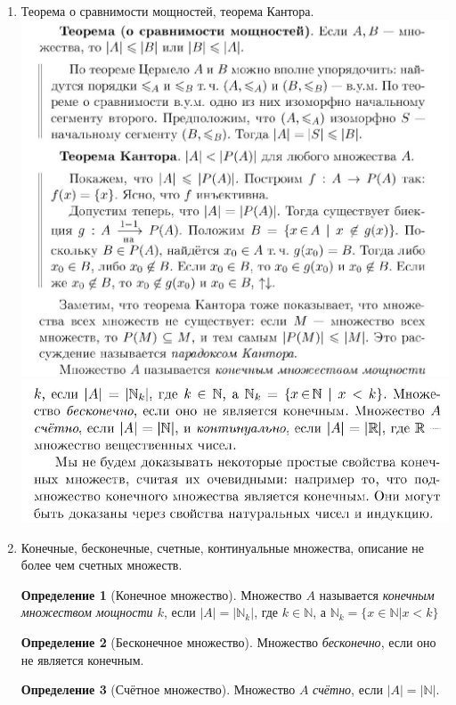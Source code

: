 \documentclass[a4paper]{article}
\theoremstyle{definition}
\newtheorem*{definition*}{Определение}
\begin{document}
\begin{enumerate}
 \item Теорема о сравнимости мощностей, теорема Кантора.
       \mbox{}\\ \includegraphics[scale=0.35]{20_1.jpg}\\
       \includegraphics[scale=0.35]{20_2.jpg}\\
 \item Конечные, бесконечные, счетные, континуальные множества, описание не более чем счетных множеств.
       \begin{definition*}[Конечное множество]
        Множество $A$ называется \textit{конечным множеством мощности $k$}, если $|A| = |\mathbb{N}_k|$, где $k \in \mathbb{N}$, а $\mathbb{N}_k = \{x \in \mathbb{N} | x < k\}$
       \end{definition*}
       \begin{definition*}[Бесконечное множество]
        Множество \textit{бесконечно}, если оно не является конечным.
       \end{definition*}
       \begin{definition*}[Счётное множество]
        Множество $A$ \textit{счётно}, если $|A| = |\mathbb{N}|$.

\end{definition*}
\end{enumerate}
\end{document}
